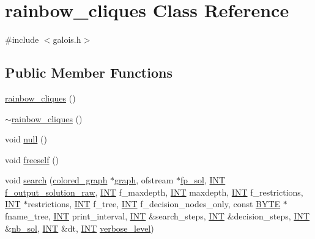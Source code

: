 \hypertarget{classrainbow__cliques}{}\section{rainbow\+\_\+cliques Class Reference}
\label{classrainbow__cliques}


{\ttfamily \#include $<$galois.\+h$>$}

\subsection*{Public Member Functions}
\begin{DoxyCompactItemize}
\item 
\mbox{\hyperlink{classrainbow__cliques_a3f32ee079bfabaf45bcb85f25c5427b6}{rainbow\+\_\+cliques}} ()
\item 
\mbox{\hyperlink{classrainbow__cliques_aff48865648d653cb9a0b3ca93c294ff7}{$\sim$rainbow\+\_\+cliques}} ()
\item 
void \mbox{\hyperlink{classrainbow__cliques_a3b0ab87c2529f70e1a59a2a85b97701b}{null}} ()
\item 
void \mbox{\hyperlink{classrainbow__cliques_ad80bc5cd0e763b021717dffdeeeb3982}{freeself}} ()
\item 
void \mbox{\hyperlink{classrainbow__cliques_a068ae8a136fca21b0e5bfe6d7605d3d6}{search}} (\mbox{\hyperlink{classcolored__graph}{colored\+\_\+graph}} $\ast$\mbox{\hyperlink{nauty_8h_a28c08db7c5948ab173e0f0497773f2f1}{graph}}, ofstream $\ast$\mbox{\hyperlink{classrainbow__cliques_a72f4548c18f89f9bf06435b9c351fc96}{fp\+\_\+sol}}, \mbox{\hyperlink{galois_8h_a09fddde158a3a20bd2dcadb609de11dc}{I\+NT}} \mbox{\hyperlink{classrainbow__cliques_a11c5b24cf5386c87b7e968fcf42b18ee}{f\+\_\+output\+\_\+solution\+\_\+raw}}, \mbox{\hyperlink{galois_8h_a09fddde158a3a20bd2dcadb609de11dc}{I\+NT}} f\+\_\+maxdepth, \mbox{\hyperlink{galois_8h_a09fddde158a3a20bd2dcadb609de11dc}{I\+NT}} maxdepth, \mbox{\hyperlink{galois_8h_a09fddde158a3a20bd2dcadb609de11dc}{I\+NT}} f\+\_\+restrictions, \mbox{\hyperlink{galois_8h_a09fddde158a3a20bd2dcadb609de11dc}{I\+NT}} $\ast$restrictions, \mbox{\hyperlink{galois_8h_a09fddde158a3a20bd2dcadb609de11dc}{I\+NT}} f\+\_\+tree, \mbox{\hyperlink{galois_8h_a09fddde158a3a20bd2dcadb609de11dc}{I\+NT}} f\+\_\+decision\+\_\+nodes\+\_\+only, const \mbox{\hyperlink{galois_8h_ab6cc7b4aeb6ea31aba2b3fbfc83ff5e6}{B\+Y\+TE}} $\ast$fname\+\_\+tree, \mbox{\hyperlink{galois_8h_a09fddde158a3a20bd2dcadb609de11dc}{I\+NT}} print\+\_\+interval, \mbox{\hyperlink{galois_8h_a09fddde158a3a20bd2dcadb609de11dc}{I\+NT}} \&search\+\_\+steps, \mbox{\hyperlink{galois_8h_a09fddde158a3a20bd2dcadb609de11dc}{I\+NT}} \&decision\+\_\+steps, \mbox{\hyperlink{galois_8h_a09fddde158a3a20bd2dcadb609de11dc}{I\+NT}} \&\mbox{\hyperlink{plane__search_8_c_a0029b734487624c93c3a72d74a8f2bf9}{nb\+\_\+sol}}, \mbox{\hyperlink{galois_8h_a09fddde158a3a20bd2dcadb609de11dc}{I\+NT}} \&dt, \mbox{\hyperlink{galois_8h_a09fddde158a3a20bd2dcadb609de11dc}{I\+NT}} \mbox{\hyperlink{simeon_8_c_a818073fbcc2f439e7c56952f67386122}{verbose\+\_\+level}})

\end{DoxyCompactItemize}
